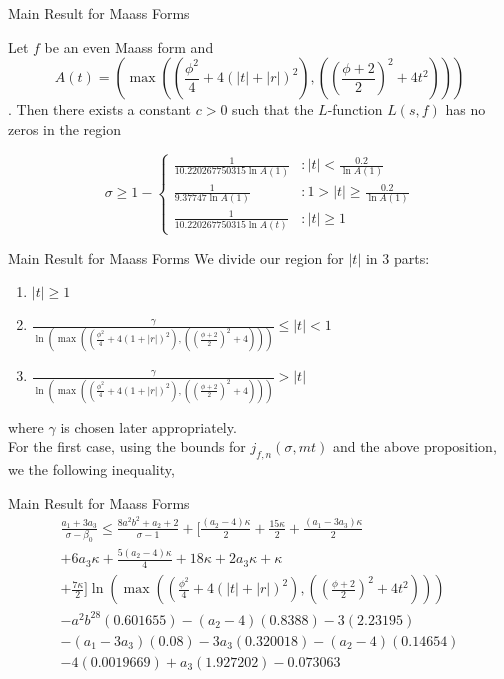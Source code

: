 \documentclass{beamer}
\begin{document}
\begin{frame}{Main Result for Maass Forms}
\begin{theorem}
        Let $f$ be an even Maass form and \[A(t) = \left(\max \left(\left( \frac{\phi^2}{4} + 4(|t|+|r|)^2\right),\left( \left(\frac{\phi+2}{2}\right)^2 +4t^2 \right) \right)\right)\]. Then there exists a constant $c > 0$ such that the $L$-function $L(s,f)$ has no zeros in the region
    
        \[
        \sigma \geq 1 - \begin{cases}
        \frac{1}{10.220267750315\ln A(1)} & : |t| < \frac{0.2}{\ln A(1)}\\
        \frac{1}{9.37747\ln A(1)} & : 1>|t| \geq \frac{0.2}{\ln A(1)}\\
        \frac{1}{10.220267750315\ln A(t)} & : |t| \geq 1
        \end{cases}
        \]
    \end{theorem}

\end{frame}

\begin{frame}{Main Result for Maass Forms}
    We divide our region for $|t|$ in 3 parts:
    \begin{enumerate}
        \item $|t|\geq 1$
        \item $ \frac{\gamma}{\ln \left(\max \left(\left( \frac{\phi^2}{4} + 4(1+|r|)^2\right),\left( \left(\frac{\phi+2}{2}\right)^2 +4 \right) \right)\right)}\leq|t|<1$
        \item $\frac{\gamma}{\ln \left(\max \left(\left( \frac{\phi^2}{4} + 4(1+|r|)^2\right),\left( \left(\frac{\phi+2}{2}\right)^2 +4 \right) \right)\right)}>|t|$
    \end{enumerate}
 where $\gamma $ is chosen later appropriately.
    \\For the first case, using the bounds for $j_{f,n}(\sigma,mt)$ and the above proposition, we the following inequality,
\end{frame}
\begin{frame}{Main Result for Maass Forms}
\begin{multline*}
    \frac{a_1+3a_3}{\sigma-\beta_0  } \leq \frac{8a^2b^2+a_2+2}{\sigma-1} + \Big[ \frac{(a_2-4)\kappa}{2} + \frac{15\kappa}{2} + \frac{(a_1-3a_3)\kappa}{2}  \\+6a_3\kappa  + \frac{5(a_2-4)\kappa}{4} +18\kappa+  2a_3\kappa + \kappa\\ + \frac{7\kappa}{2} \Big]  \ln \left(\max \left(\left( \frac{\phi^2}{4} + 4(|t|+|r|)^2\right),\left( \left(\frac{\phi+2}{2}\right)^2 +4t^2 \right) \right)\right) \\  -a^2b^28(0.601655) -(a_2-4)(0.8388)-3(2.23195)\\ -(a_1-3a_3)(0.08) -3a_3(0.320018)-(a_2-4)(0.14654)\\ - 4(0.0019669) +a_3(1.927202)-0.073063
\end{multline*}   
\end{frame}
\end{document}
